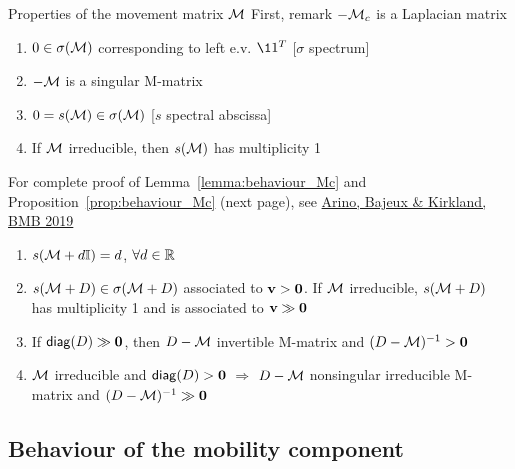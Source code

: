 \documentclass[aspectratio=43]{beamer}
\begin{document}
\begin{frame}{Properties of the movement matrix $\mathcal{M}$}
	First, remark $-\mathcal{M}_c$ is a Laplacian matrix
	\vfill
	\begin{lemma}\label{lemma:behaviour_Mc}
		\begin{enumerate}
			\item $0\in\sigma(\mathcal{M})$ corresponding to left e.v. $\11^T$ \hfill[$\sigma$ spectrum]
			\item $-\mathcal{M}$ is a singular M-matrix
			\item $0=s(\mathcal{M})\in\sigma(\mathcal{M})$ \hfill[$s$ spectral abscissa]
			\item If $\mathcal{M}$ irreducible, then $s(\mathcal{M})$ has multiplicity 1
		\end{enumerate}
	\end{lemma}
	\vfill
	For complete proof of Lemma~\ref{lemma:behaviour_Mc} and Proposition~\ref{prop:behaviour_Mc} (next page), see \href{http://dx.doi.org/10.1007/s11538-019-00593-1}{Arino, Bajeux \& Kirkland, BMB 2019}
\end{frame}

\begin{frame}
	\begin{proposition}
		\label{prop:behaviour_Mc}
		\begin{enumerate}
			\item $s(\mathcal{M}+d\mathbb{I})=d$, $\forall d\in\mathbb{R}$
			\item $s(\mathcal{M}+D)\in\sigma(\mathcal{M}+D)$ associated to $\bv>\b0$. If $\mathcal{M}$ irreducible, $s(\mathcal{M}+D)$ has  multiplicity 1 and is associated to $\bv\gg \b0$
			\item If $\diag (D)\gg \b0$, then $D-\mathcal{M}$ invertible M-matrix and $(D-\M)^{-1}> \b0$
			\item $\mathcal{M}$ irreducible and $\diag(D)>\b0$ $\Longrightarrow$ $D-\mathcal{M}$ nonsingular irreducible M-matrix and $(D-\M)^{-1}\gg \b0$		
		\end{enumerate}
	\end{proposition}
\end{frame}


\subsection{Behaviour of the mobility component}
\end{document}
